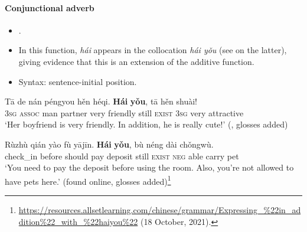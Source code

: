 \paragraph{Conjunctional adverb}\label{appendixMandarinConjunctional}
\begin{itemize}
	\item \textcite[89]{RossShengMa2014}.
	\item In this function, \textit{hái} appears in the collocation \textit{hái yǒu} (see  on the latter), giving evidence that this is an extension of the additive function.
	\item Syntax: sentence-initial position.
\end{itemize}
\largerpage
\begin{exe}
	\ex
	\gll Tā de nán péngyou hěn héqi. \textbf{Hái} \textbf{yǒu}, tā hěn shuài!\\
	3\textsc{sg} \textsc{assoc} man partner very friendly still \textsc{exist} 3\textsc{sg} very attractive\\
	\glt \lq Her boyfriend is very friendly. In addition, he is really cute!\rq{ }(\cite[89]{RossShengMa2014}, glosses added)

	\ex
	\gll Rùzhù qián yào fù yājīn. \textbf{Hái} \textbf{yǒu}, bù néng dài chǒngwù.\\
	check\_in before should pay deposit still \textsc{exist} \textsc{neg} able carry pet\\
	\glt \lq You need to pay the deposit before using the room. Also, you're not allowed to have pets here.' (found online, glosses added)\footnote{\url{https://resources.allsetlearning.com/chinese/grammar/Expressing_\%22in_addition\%22_with_\%22haiyou\%22} (18 October, 2021).}
\end{exe}


